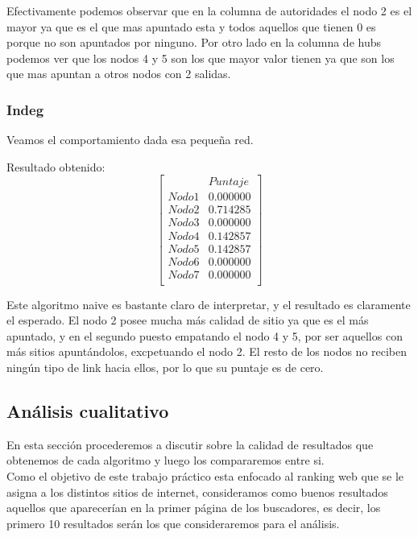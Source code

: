 Efectivamente podemos observar que en la columna de autoridades el nodo 2 es el mayor ya que es el que mas apuntado esta y todos aquellos que tienen 0 es porque no son apuntados por ninguno. Por otro lado en la columna de hubs podemos ver que los nodos 4 y 5 son los que mayor valor tienen ya que son los que mas apuntan a otros nodos con 2 salidas.

\subsubsection{Indeg}
 	Veamos el comportamiento dada esa pequeña red.

 	Resultado obtenido:
   $$ 
\begin{bmatrix}
              &    Puntaje \\
 Nodo 1 &    0.000000 \\
 Nodo 2   &  0.714285 \\
 Nodo 3   &  0.000000 \\
 Nodo 4   &  0.142857 \\
 Nodo 5   &  0.142857 \\
 Nodo 6   &  0.000000 \\
 Nodo 7   &  0.000000 \\
\end{bmatrix} 
$$

Este algoritmo naive es bastante claro de interpretar, y el resultado es claramente el esperado. El nodo 2 posee mucha más calidad de sitio ya que es el más apuntado, y en el segundo puesto empatando el nodo 4 y 5, por ser aquellos con más sitios apuntándolos, excpetuando el nodo 2. El resto de los nodos no reciben ningún tipo de link hacia ellos, por lo que su puntaje es de cero.

\subsection{Análisis cualitativo}

En esta sección procederemos a discutir sobre la calidad de resultados que obtenemos de cada algoritmo y luego los compararemos entre si.\\
Como el objetivo de este trabajo práctico esta enfocado al ranking web que se le asigna a los distintos sitios de internet, consideramos como buenos resultados aquellos que aparecerían en la primer página de los buscadores, es decir, los primero 10 resultados serán los que consideraremos para el análisis.

